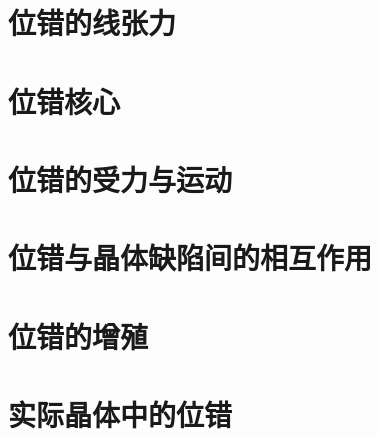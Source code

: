         \section{位错的线张力}
        \section{位错核心}
        \section{位错的受力与运动}
        \section{位错与晶体缺陷间的相互作用}
        \section{位错的增殖}
        \section{实际晶体中的位错}
        